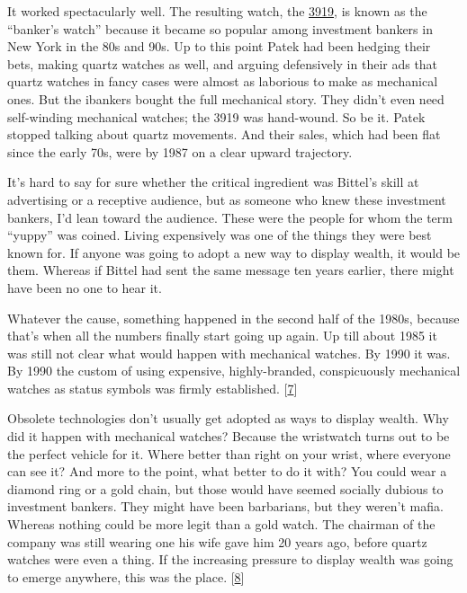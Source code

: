 It worked spectacularly well. The resulting watch, the
\href{https://www.sothebys.com/en/buy/auction/2019/watches-online-6/patek-philippe-ref-3919j-a-yellow-gold-wristwatch/}{3919},
is known as the ``banker's watch'' because it became so popular among
investment bankers in New York in the 80s and 90s. Up to this point
Patek had been hedging their bets, making quartz watches as well, and
arguing defensively in their ads that quartz watches in fancy cases were
almost as laborious to make as mechanical ones. But the ibankers bought
the full mechanical story. They didn't even need self-winding mechanical
watches; the 3919 was hand-wound. So be it. Patek stopped talking about
quartz movements. And their sales, which had been flat since the early
70s, were by 1987 on a clear upward trajectory.

It's hard to say for sure whether the critical ingredient was Bittel's
skill at advertising or a receptive audience, but as someone who knew
these investment bankers, I'd lean toward the audience. These were the
people for whom the term ``yuppy'' was coined. Living expensively was
one of the things they were best known for. If anyone was going to adopt
a new way to display wealth, it would be them. Whereas if Bittel had
sent the same message ten years earlier, there might have been no one to
hear it.

Whatever the cause, something happened in the second half of the 1980s,
because that's when all the numbers finally start going up again. Up
till about 1985 it was still not clear what would happen with mechanical
watches. By 1990 it was. By 1990 the custom of using expensive,
highly-branded, conspicuously mechanical watches as status symbols was
firmly established. {[}\hyperref[f7n]{7}{]}

Obsolete technologies don't usually get adopted as ways to display
wealth. Why did it happen with mechanical watches? Because the
wristwatch turns out to be the perfect vehicle for it. Where better than
right on your wrist, where everyone can see it? And more to the point,
what better to do it with? You could wear a diamond ring or a gold
chain, but those would have seemed socially dubious to investment
bankers. They might have been barbarians, but they weren't mafia.
Whereas nothing could be more legit than a gold watch. The chairman of
the company was still wearing one his wife gave him 20 years ago, before
quartz watches were even a thing. If the increasing pressure to display
wealth was going to emerge anywhere, this was the place.
{[}\hyperref[f8n]{8}{]}

